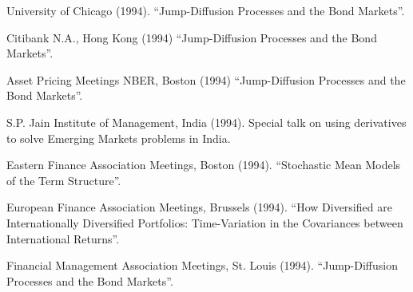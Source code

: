 \documentclass{article}
\begin{document}
\begin{etaremune}
{\item University of Chicago (1994).
``Jump-Diffusion Processes and the Bond Markets''.

\item Citibank N.A., Hong Kong (1994)
``Jump-Diffusion Processes and the Bond Markets''.

\item Asset Pricing Meetings NBER, Boston (1994)
``Jump-Diffusion Processes and the Bond Markets''.

\item S.P. Jain Institute of Management, India (1994).
Special talk on using derivatives to solve Emerging Markets problems
in India.

\item Eastern Finance Association Meetings, Boston (1994).
``Stochastic Mean Models of the Term Structure''. 

\item European Finance Association Meetings, Brussels (1994).
``How Diversified are Internationally Diversified Portfolios:
Time-Variation in the Covariances between International Returns''.

\item Financial Management Association Meetings, St. Louis (1994).
``Jump-Diffusion Processes and the Bond Markets''.
}

\end{etaremune}
\end{document}
